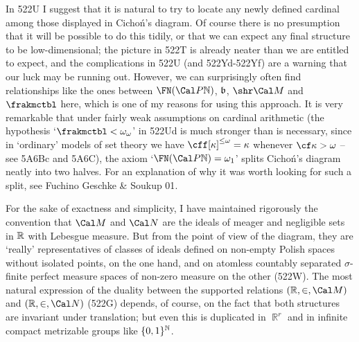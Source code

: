 {In 522U I suggest that it is natural to try to locate any newly defined
cardinal among those displayed in Cicho\'n's diagram.   Of course there
is no presumption that it will be possible to do this tidily, or that we
can expect any final structure to be low-dimensional;  the picture in
522T is already neater than we are entitled to expect, and the
complications in 522U (and 522Yd-522Yf) %
are a warning that our luck may be running out.   However, we can
surprisingly often find relationships like the ones between
$\FN(\Cal P\Bbb N)$, $\frak b$, $\shr\Cal M$ and $\frakmctbl$ here,
which is one of my reasons for using this approach.   It is very
remarkable that under fairly weak assumptions on cardinal arithmetic
(the hypothesis
`$\frakmctbl<\omega_{\omega}$' in 522Ud is much stronger than is
necessary, since in `ordinary' models of set theory we have
$\cff[\kappa]^{\le\omega}=\kappa$ whenever $\cf\kappa>\omega$ -- see
5A6Bc and 5A6C),
the axiom `$\FN(\Cal P\Bbb N)=\omega_1$' splits Cicho\'n's diagram neatly
into two halves.   For an explanation of why it was worth looking for
such a split, see {\smc Fuchino Geschke \& Soukup 01}.

For the sake of exactness and simplicity, I have maintained rigorously
the convention that $\Cal M$ and $\Cal N$ are the ideals of meager and
negligible sets in $\Bbb R$ with Lebesgue measure.   But from the point
of view of the diagram, they are `really' representatives of
classes of ideals defined on non-empty Polish spaces without isolated
points, on the one hand, and on atomless countably separated
$\sigma$-finite perfect measure spaces of non-zero measure on the other
(522W).   The most natural expression of the duality between the
supported relations $(\Bbb R,\in,\Cal M)$ and $(\Bbb R,\in,\Cal N)$
(522G) depends, of course, on the fact that both structures are
invariant under translation;  but even this is duplicated in $\BbbR^r$
and in infinite compact metrizable groups like $\{0,1\}^{\Bbb N}$.

}
